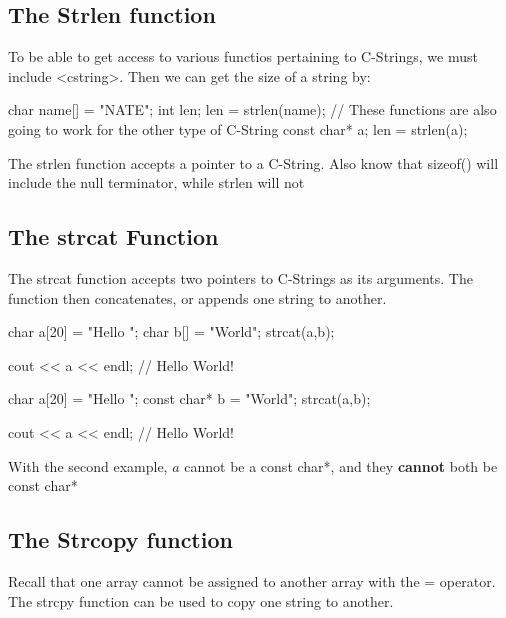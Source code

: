 \documentclass{report}
\begin{document}
    \bigbreak \noindent 
    \subsection{The Strlen function}
    \bigbreak \noindent 
    To be able to get access to various functios pertaining to C-Strings, we must include <cstring>. Then we can get the size of a string by:
    \bigbreak \noindent 
    
    \begin{cppcode}
char name[] = "NATE";
int len;
len = strlen(name);
// These functions are also going to work for the other type of C-String
const char* a;
len = strlen(a);
    \end{cppcode}
    
    \bigbreak \noindent 
    \begin{notebox}
			The strlen function accepts a pointer to a C-String. Also know that sizeof() will include the null terminator, while strlen will not
		\end{notebox}


    \pagebreak \bigbreak \noindent 
    \subsection{The strcat Function}
    \bigbreak \noindent 
    The strcat function accepts two pointers to C-Strings as its arguments. The function then concatenates, or appends one string to another.
    \bigbreak \noindent 
    
    \begin{cppcode}
char a[20] = "Hello ";
char b[] = "World";
strcat(a,b);

cout << a << endl; // Hello World!

char a[20] = "Hello ";
const char* b = "World";
strcat(a,b);

cout << a << endl; // Hello World!
    \end{cppcode}
    
    \bigbreak \noindent 
    \begin{notebox}
        With the second example, $a$ cannot be a const char*, and they \textbf{cannot} both be const char*
    \end{notebox}
    
    \bigbreak \noindent 
    \subsection{The Strcopy function}
    \bigbreak \noindent 
    Recall that one array cannot be assigned to another array with the = operator. The strcpy function can be used to copy one string to another.
    \bigbreak \noindent 
    
\end{document}

